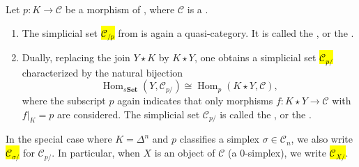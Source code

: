 \begin{definition} \label{definition:overcategory_and_undercategory_of_an_infty_category_with_respect_to_a_map_from_a_simplicial_set}
Let $p : K \to \mathcal{C}$ be a morphism of , where $\mathcal{C}$ is a .

\begin{enumerate}
    \item The simplicial set \hl{$\mathcal{C}_{/p}$} from  is again a quasi-category. It is called the , or the .

    \item Dually, replacing the join $Y \star K$ by $K \star Y$, one obtains a simplicial set \hl{$\mathcal{C}_{p/}$} characterized by the natural bijection
    $$\operatorname{Hom}_{s\mathbf{Set}}(Y, \mathcal{C}_{p/}) \cong \operatorname{Hom}_{p}(K \star Y, \mathcal{C}),$$
    where the subscript $p$ again indicates that only morphisms $f : K \star Y \to \mathcal{C}$ with $f|_{K} = p$ are considered. The simplicial set $\mathcal{C}_{p/}$ is called the , or the .
\end{enumerate}
In the special case where $K = \Delta^n$ and $p$ classifies a simplex $\sigma \in \mathcal{C}_n$, we also write \hl{$\mathcal{C}_{\sigma/}$} for $\mathcal{C}_{p/}$. In particular, when $X$ is an object of $\mathcal{C}$ (a 0-simplex), we write \hl{$\mathcal{C}_{X/}$}.
\end{definition}
